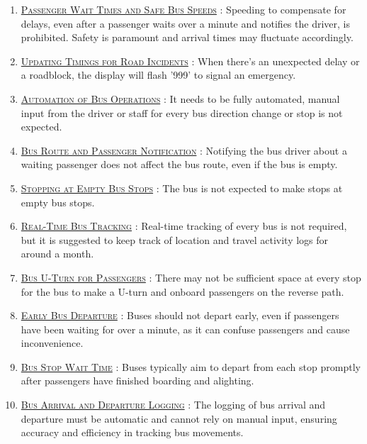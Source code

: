 \begin{enumerate}
    \item \underline{\textsc{Passenger Wait Times and Safe Bus Speeds}} : Speeding to compensate for delays, even after a passenger waits over a minute and notifies the driver, is prohibited. Safety is paramount and arrival times may fluctuate accordingly.

    \item \underline{\textsc{Updating Timings for Road Incidents}} : When there's an unexpected delay or a roadblock, the display will flash '999' to signal an emergency.

    \item \underline{\textsc{Automation of Bus Operations}} :  It needs to be fully automated, manual input from the driver or staff for every bus direction change or stop is not expected.

    \item \underline{\textsc{Bus Route and Passenger Notification}} : Notifying the bus driver about a waiting passenger does not affect the bus route, even if the bus is empty.

    \item \underline{\textsc{Stopping at Empty Bus Stops}} : The bus is not expected to make stops at empty bus stops.

    \item \underline{\textsc{Real-Time Bus Tracking}} : Real-time tracking of every bus is not required, but it is suggested to keep track of location and travel activity logs for around a month.

    \item \underline{\textsc{Bus U-Turn for Passengers}} : There may not be sufficient space at every stop for the bus to make a U-turn and onboard passengers on the reverse path.

    \item \underline{\textsc{Early Bus Departure}} : Buses should not depart early, even if passengers have been waiting for over a minute, as it can confuse passengers and cause inconvenience.

    \item \underline{\textsc{Bus Stop Wait Time}} : Buses typically aim to depart from each stop promptly after passengers have finished boarding and alighting.

    \item \underline{\textsc{Bus Arrival and Departure Logging}} : The logging of bus arrival and departure must be automatic and cannot rely on manual input, ensuring accuracy and efficiency in tracking bus movements.


\end{enumerate}
